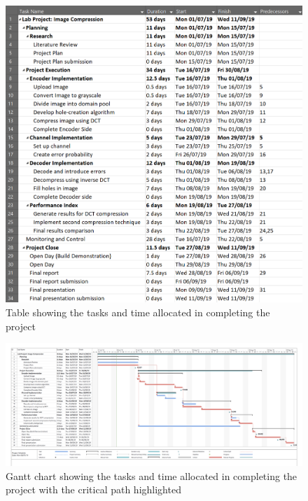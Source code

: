 \documentclass[10pt,twocolumn, a4paper]{witseiepaper}
\begin{document}
\onecolumn
\begin{figure}[h!]
\renewcommand{\thefigure}{\arabic{figure}}
\centering
\includegraphics[scale=0.8, frame]{TableTasks.png}
\caption{Table showing the tasks and time allocated in completing the project}
\label{fig: Tasks}
\end{figure}

\newpage
\begin{landscape}
\begin{figure}[h!]
\renewcommand{\thefigure}{\arabic{figure}}
\centering
\hspace{-1.5cm}
\includegraphics[scale=0.5, frame]{Gantt.png}
\caption{Gantt chart showing the tasks and time allocated in completing the project with the critical path highlighted}
\label{fig: Gantt}
\end{figure}
\end{landscape}
\end{document}
